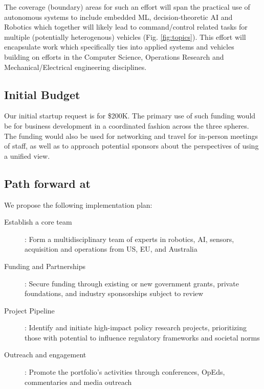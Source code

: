 \documentclass[11pt,letterpaper]{article}
\begin{document}

The coverage (boundary) areas for such an effort will span the
practical use of autonomous systems to include embedded ML,
decision-theoretic AI and Robotics which together will likely lead to
command/control related tasks for multiple (potentially heterogenous)
vehicles (Fig. \ref{fig:topics}). This effort will encapsulate work
which specifically ties into applied systems and vehicles building on
efforts in the Computer Science, Operations Research and
Mechanical/Electrical engineering disciplines.

\subsection{Initial Budget}

Our initial startup request is for \$200K. The primary use of such
funding would be for business development in a coordinated fashion
across the three spheres. The funding would also be used for
networking and travel for in-person meetings of \org staff, as well as
to approach potential sponsors about the perspectives of using a
unified view. 


\subsection{Path forward at \org}

We propose the following implementation plan:

\begin{description}

\item[Establish a core team]: Form a multidisciplinary team of \org
  experts in robotics, AI, sensors, acquisition and operations from
  \org US, EU, and Australia

\item[Funding and Partnerships]: Secure funding through existing or
  new government grants, private foundations, and industry
  sponsorships subject to review

\item[Project Pipeline]: Identify and initiate high-impact policy
  research projects, prioritizing those with potential to influence
  regulatory frameworks and societal norms
  
\item[Outreach and engagement]: Promote the portfolio’s activities
  through conferences, OpEds, commentaries and media outreach

\end{description}
\end{document}
